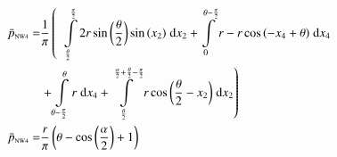 \begin{align}
    \bar{p}_{\text{\tiny{NW4}}} =&\frac{1}{\pi} \left(\;\;\int\limits_{\frac{\theta}{2}}^{\frac{\pi}{2}}2 r \sin{\left (\frac{\theta}{2} \right )} \sin{\left (x_{2} \right )}\;\mathrm{d}x_{2}+\int\limits_{0}^{\theta - \frac{\pi}{2}}r - r \cos{\left (- x_{4} + \theta \right )}\;\mathrm{d}x_{4}\right.\notag\\
 &\left.+\int\limits_{\theta - \frac{\pi}{2}}^{\theta}r\;\mathrm{d}x_{4}+\int\limits_{\frac{\theta}{2}}^{\frac{\alpha}{2} + \frac{\theta}{2} - \frac{\pi}{2}}r \cos{\left (\frac{\theta}{2} - x_{2} \right )}\;\mathrm{d}x_{2}\right)\label{pNW4Def}\\
    \bar{p}_{\text{\tiny{NW4}}}  =& \frac{r}{\pi} \left(\theta - \cos{\left (\frac{\alpha}{2} \right )} + 1\right)\label{pNW4Sln}
\end{align}